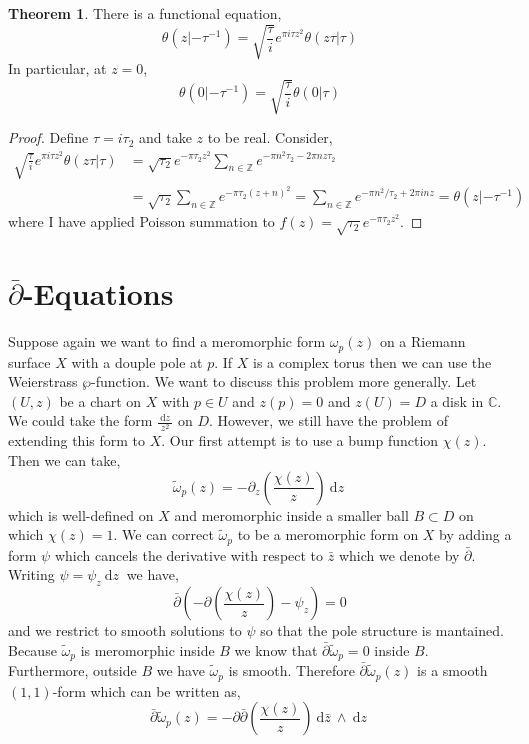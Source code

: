 \documentclass[12pt]{extarticle}
\newcommand{\Z}{\mathbb{Z}}
\newcommand{\C}{\mathbb{C}}
\renewcommand{\d}[1]{\: \mathrm{d}#1 \:}
\theoremstyle{definition}
\newtheorem{theorem}{Theorem}[section]
\begin{document}
\begin{theorem}
There is a functional equation,
\[ \theta(z | - \tau^{-1}) = \sqrt{\frac{\tau}{i}} e^{\pi i \tau z^2} \theta(z \tau | \tau) \]
In particular, at $z = 0$,
\[ \theta(0 | - \tau^{-1}) = \sqrt{\frac{\tau}{i}} \theta(0 | \tau) \]
\end{theorem}

\begin{proof}
Define $\tau = i \tau_2$ and take $z$ to be real. Consider,
\begin{align*}
\sqrt{\frac{\tau}{i}} e^{\pi i \tau z^2} \theta(z \tau | \tau) & = \sqrt{\tau_2} e^{-\pi \tau_2 z^2} \sum_{n \in \Z} e^{- \pi n^2 \tau_2 - 2 \pi n z \tau_2 } 
\\
& = \sqrt{\tau_2} \sum_{n \in \Z} e^{-\pi \tau_2 (z + n)^2} = \sum_{n \in \Z} e^{- \pi n^2 / \tau_2 + 2 \pi i n z} = \theta(z | - \tau^{-1})
\end{align*}
where I have applied Poisson summation to $f(z) = \sqrt{\tau_2} e^{-\pi \tau_2 z^2}$. 
\end{proof}

\section{$\bar{\partial}$-Equations}

Suppose again we want to find a meromorphic form $\omega_{p}(z)$ on a Riemann surface $X$ with a douple pole at $p$. If $X$ is a complex torus then we can use the Weierstrass $\wp$-function. We want to discuss this problem more generally. Let $(U, z)$ be a chart on $X$ with $p \in U$ and $z(p) = 0$ and $z(U) = D$ a disk in $\C$. We could take the form $\frac{\d{z}}{z^2}$ on $D$. However, we still have the problem of extending this form to $X$. Our first attempt is to use a bump function $\chi(z)$. Then we can take,
\[ \tilde{\omega}_p(z) = - \partial_z \left( \frac{\chi(z)}{z} \right) \d{z} \]
which is well-defined on $X$ and meromorphic inside a smaller ball $B \subset D$ on which $\chi(z) = 1$. We can correct $\tilde{\omega}_p$ to be a meromorphic form on $X$ by adding a form $\psi$ which cancels the derivative with respect to $\bar{z}$ which we denote by $\bar{\partial}$. Writing $\psi = \psi_z \d{z}$ we have,
\[ \bar{\partial} \left( - \partial \left( \frac{\chi(z)}{z} \right) - \psi_z \right) = 0 \]
and we restrict to smooth solutions to $\psi$ so that the pole structure is mantained. Because $\tilde{\omega}_p$ is meromorphic inside $B$ we know that $\bar{\partial} \tilde{\omega}_p = 0$ inside $B$. Furthermore, outside $B$ we have $\tilde{\omega}_p$ is smooth. Therefore $\bar{\partial} \tilde{\omega}_p(z)$ is a smooth $(1,1)$-form which can be written as,
\[ \bar{\partial} \tilde{\omega}_p(z) = - \partial \bar{\partial} \left( \frac{\chi(z)}{z} \right) \d{\bar{z}} \wedge \d{z} \]
\end{document}
